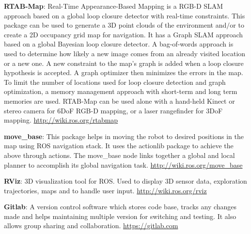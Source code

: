 \textbf{RTAB-Map}: Real-Time Appearance-Based Mapping\cite{50} is a RGB-D SLAM approach based on a global loop closure detector with real-time constraints. This package can be used to generate a 3D point clouds of the environment and$/$or to create a 2D occupancy grid map for navigation. It has a Graph SLAM approach based on a global Bayesian loop closure detector. A bag-of-words approach is used to determine how likely a new image comes from an already visited location or a new one. A new constraint to the map's graph is added when a loop closure hypothesis is accepted. A graph optimizer then minimizes the errors in the map. To limit the number of locations used for loop closure detection and graph optimization, a memory management approach with short-term and long term memories are used. RTAB-Map can be used alone with a hand-held Kinect or stereo camera for 6DoF RGB-D mapping, or a laser rangefinder for 3DoF mapping. \url{http://wiki.ros.org/rtabmap} 

\textbf{move\_base}: This package helps in moving the robot to desired positions in the map using ROS navigation stack. It uses the actionlib package to achieve the above through actions. The move\_base node links together a global and local planner to accomplish its global navigation task. \url{http://wiki.ros.org/move_base}

\textbf{RViz}: 3D visualization tool for ROS. Used to display 3D sensor data, exploration trajectories, maps and to handle user input. \url{http://wiki.ros.org/rviz} 

\textbf{Gitlab}: A version control software which stores code base, tracks any changes made and helps maintaining multiple version for switching and testing. It also allows group sharing and collaboration. \url{https://gitlab.com}